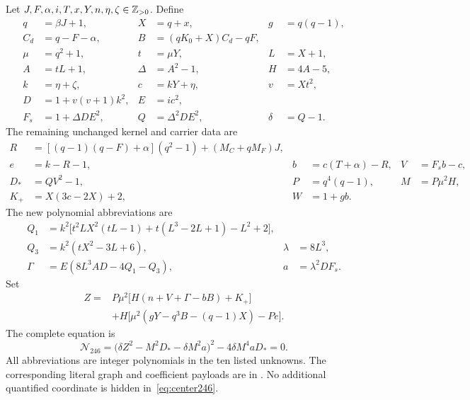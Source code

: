 Let $J,F,\alpha,i,T,x,Y,n,\eta,\zeta\in\mathbb Z_{>0}$.  Define
\begin{align*}
 q&=\beta J+1,&X&=q+x,&g&=q(q-1),\\
 C_d&=q-F-\alpha,&B&=(qK_0+X)C_d-qF,\\
 \mu&=q^2+1,&t&=\mu Y,&L&=X+1,\\
 A&=tL+1,&\Delta&=A^2-1,&H&=4A-5,\\
 k&=\eta+\zeta,&c&=kY+\eta,&v&=Xt^2,\\
 D&=1+v(v+1)k^2,&E&=ic^2,\\
 F_s&=1+\Delta DE^2,&Q&=\Delta^2DE^2,&\delta&=Q-1.
\end{align*}
The remaining unchanged kernel and carrier data are
\begin{align*}
 R&=[(q-1)(q-F)+\alpha](q^2-1)+(M_C+qM_F)J,\\
 e&=k-R-1,&b&=c(T+\alpha)-R,&V&=F_sb-c,\\
 D_*&=QV^2-1,&P&=q^4(q-1),&M&=P\mu^2H,\\
 K_+&=X(3c-2X)+2,&W&=1+gb.
\end{align*}
The new polynomial abbreviations are
\begin{align}
 Q_1&=k^2\bigl[t^2LX^2(tL-1)+t(L^3-2L+1)-L^2+2\bigr],\label{eq:center-Q1}\\
 Q_3&=k^2(tX^2-3L+6),&\lambda&=8L^3,\label{eq:center-Q3}\\
 \Gamma&=E(8L^3AD-4Q_1-Q_3),&a&=\lambda^2DF_s.\label{eq:center-Gamma}
\end{align}
Set
\begin{equation}\label{eq:center-Z}
 \begin{aligned}
 Z={}&P\mu^2\bigl[H(n+V+\Gamma-bB)+K_+\bigr]\\
     &+H\bigl[\mu^2(gY-q^3B-(q-1)X)-Pe\bigr].
 \end{aligned}
\end{equation}
The complete equation is
\begin{equation}\label{eq:center246}
 \boxed{\mathcal N_{246}
 =\bigl(\delta Z^2-M^2D_*-\delta M^2a\bigr)^2
       -4\delta M^4aD_*=0.}
\end{equation}
All abbreviations are integer polynomials in the ten listed unknowns.
The corresponding literal graph and coefficient payloads are in
.  No additional quantified coordinate is hidden
in~\eqref{eq:center246}.

